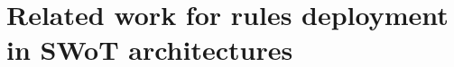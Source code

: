 \documentclass{iosart2c}
\begin{document}
%


\section{Related work for rules deployment in SWoT architectures}
\label{sec:related_work_distribution}
\end{document}
